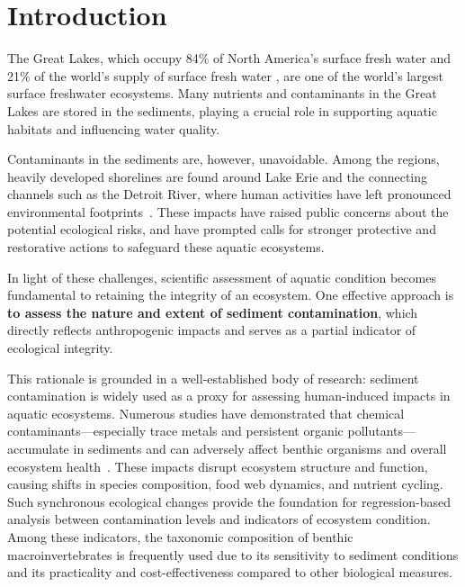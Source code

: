 \section{Introduction}


The Great Lakes, which occupy 84\% 
of North America's surface fresh water and 21\% of the world's supply of surface fresh water
\cite{EPA_Greatlakes2024}, are one of the world's largest surface freshwater ecosystems. 
Many nutrients and contaminants in the Great Lakes are stored in the sediments, playing
a crucial role in supporting aquatic habitats and influencing water quality.

Contaminants in the sediments are, however, unavoidable.
Among the regions, heavily developed shorelines are found around Lake Erie
and the connecting channels such as the Detroit River,
where human activities have left pronounced environmental footprints~\cite{EPA_SOGL2007}. 
These impacts have raised public concerns about the potential ecological risks, 
and have prompted calls for stronger protective and restorative actions 
to safeguard these aquatic ecosystems.

In light of these challenges, scientific assessment of aquatic condition becomes fundamental 
to retaining the integrity of an ecosystem. 
One effective approach is \textbf{to assess the nature and extent of sediment contamination}, 
which directly reflects anthropogenic impacts and serves as a partial indicator of ecological integrity.

This rationale is grounded in a well-established body of research:
sediment contamination is widely used as a proxy for assessing human-induced impacts in aquatic ecosystems.
Numerous studies have demonstrated that chemical contaminants—especially trace metals and persistent organic pollutants—
accumulate in sediments and can adversely affect benthic organisms and overall ecosystem health~\cite{ChiaiaHernandez2022}.
These impacts disrupt ecosystem structure and function, causing shifts in species composition, food web dynamics, and
nutrient cycling. Such synchronous ecological changes provide the foundation for regression-based analysis 
between contamination levels and indicators of ecosystem condition. 
Among these indicators, the taxonomic composition of benthic macroinvertebrates is frequently used 
due to its sensitivity to sediment conditions and its practicality and cost-effectiveness 
compared to other biological measures.

